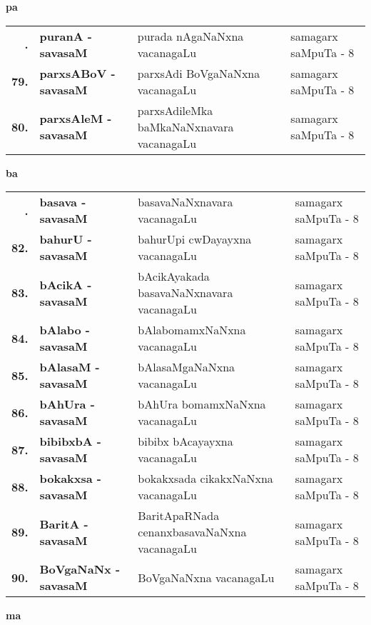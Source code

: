 \centerline{\bf pa}

{\renewcommand{\arraystretch}{1.3}
\begin{longtable}{>{\bf}r>{\bf}l>{\raggedright}p{8cm}l}
\endfirsthead
\endhead
\endfoot
\endlastfoot
78. & puranA - savasaM &  purada nAgaNaNxna vacanagaLu & samagarx saMpuTa - 8\\
79. & parxsABoV - savasaM & parxsAdi BoVgaNaNxna vacanagaLu & samagarx saMpuTa - 8 \\
80. & parxsAleM - savasaM & parxsAdileMka baMkaNaNxnavara vacanagaLu & samagarx saMpuTa - 8
\end{longtable}}

\smallskip

\centerline{\bf ba}

{\renewcommand{\arraystretch}{1.3}
\begin{longtable}{>{\bf}r>{\bf}l>{\raggedright}p{8cm}l}
\endfirsthead
\endhead
\endfoot
\endlastfoot
81. & basava - savasaM & basavaNaNxnavara vacanagaLu & samagarx saMpuTa - 8\\
82. & bahurU - savasaM & bahurUpi cwDayayxna vacanagaLu & samagarx saMpuTa - 8 \\
83. & bAcikA - savasaM & bAcikAyakada basavaNaNxnavara vacanagaLu & samagarx saMpuTa - 8 \\
84. & bAlabo - savasaM & bAlabomamxNaNxna vacanagaLu & samagarx saMpuTa - 8 \\
85. & bAlasaM - savasaM & bAlasaMgaNaNxna vacanagaLu & samagarx saMpuTa - 8 \\
86. & bAhUra - savasaM & bAhUra bomamxNaNxna vacanagaLu & samagarx saMpuTa - 8 \\
87. & bibibxbA - savasaM & bibibx bAcayayxna vacanagaLu & samagarx saMpuTa - 8 \\
88. & bokakxsa - savasaM & bokakxsada cikakxNaNxna vacanagaLu & samagarx saMpuTa - 8 \\
89. & BaritA - savasaM & BaritApaRNada cenanxbasavaNaNxna vacanagaLu & samagarx saMpuTa - 8 \\
90. & BoVgaNaNx - savasaM & BoVgaNaNxna vacanagaLu & samagarx saMpuTa - 8
\end{longtable}}
\smallskip

\centerline{\bf ma}

